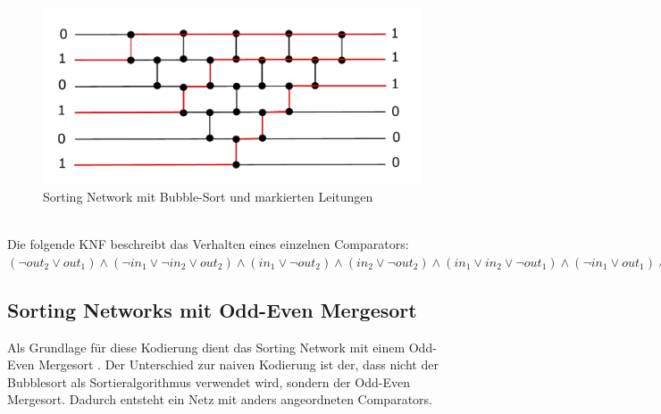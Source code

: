 \documentclass[a4,abstract=on]{scrartcl}
\begin{document}
\begin{figure}[H]
\centering
\includegraphics[width=\textwidth]{sorting_network_bubble_rot.pdf}
\caption{Sorting Network mit Bubble-Sort und markierten Leitungen}
\label{fig:sorting_network_naiv_bsp1}
\end{figure}
\ \\
Die folgende KNF beschreibt das Verhalten eines einzelnen Comparators:\\
$(\neg out_2 \vee out_1) \wedge (\neg in_1 \vee \neg in_2 \vee out_2) \wedge (in_1 \vee \neg out_2) \wedge (in_2 \vee \neg out_2) \wedge (in_1 \vee in_2 \vee \neg out_1) \wedge (\neg in_1 \vee out_1) \wedge (\neg in_2 \vee out_1)$

	\subsection{Sorting Networks mit Odd-Even Mergesort}
Als Grundlage für diese Kodierung dient das Sorting Network mit einem Odd-Even Mergesort \cite[vgl.][]{odd-even}. Der Unterschied zur naiven Kodierung ist der, dass nicht der Bubblesort als Sortieralgorithmus verwendet wird, sondern der Odd-Even Mergesort. Dadurch entsteht ein Netz mit anders angeordneten Comparators.
\end{document}
